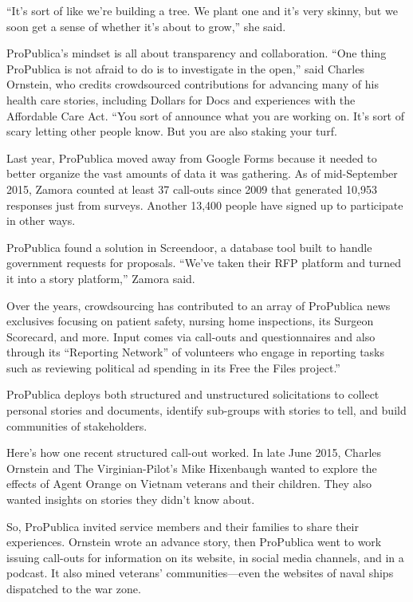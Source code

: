 \begin{itemize}
\begin{itemize}
\begin{enumerate}
{“It’s sort of like we’re building a tree. We plant one and it’s very skinny, but we soon get a sense of whether it’s about to grow,” she said.\autocite{Zamora}

ProPublica’s mindset is all about transparency and collaboration. “One thing ProPublica is not afraid to do is to investigate in the open,” said Charles Ornstein, who credits crowdsourced contributions for advancing many of his health care stories, including Dollars for Docs and experiences with the Affordable Care Act. “You sort of announce what you are working on. It’s sort of scary letting other people know. But you are also staking your turf.\autocite{Ornstein}

Last year, ProPublica moved away from Google Forms because it needed to better organize the vast amounts of data it was gathering. As of mid-September 2015, Zamora counted at least 37 call-outs since 2009 that generated 10,953 responses just from surveys. Another 13,400 people have signed up to participate in other ways.

ProPublica found a solution in Screendoor, a database tool built to handle government requests for proposals. “We’ve taken their RFP platform and turned it into a story platform,” Zamora said.

Over the years, crowdsourcing has contributed to an array of ProPublica news exclusives focusing on patient safety, nursing home inspections, its Surgeon Scorecard, and more. Input comes via call-outs and questionnaires and also through its “Reporting Network” of volunteers who engage in reporting tasks such as reviewing political ad spending in its Free the Files project.”\autocite{Files}

ProPublica deploys both structured and unstructured solicitations to collect personal stories and documents, identify sub-groups with stories to tell, and build communities of stakeholders.  

Here’s how one recent structured call-out worked. In late June 2015, Charles Ornstein and The Virginian-Pilot’s Mike Hixenbaugh wanted to explore the effects of Agent Orange on Vietnam veterans and their children. They also wanted insights on stories they didn’t know about.

So, ProPublica invited service members and their families to share their experiences. Ornstein wrote an advance story, then ProPublica went to work issuing call-outs for information on its website, in social media channels, and in a podcast. It also mined veterans’ communities---even the websites of naval ships dispatched to the war zone. 

}
\end{enumerate}
\end{itemize}
\end{itemize}
